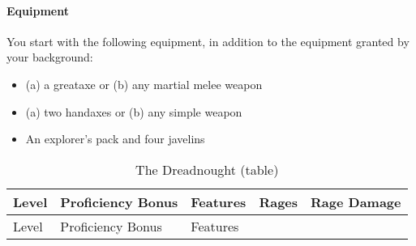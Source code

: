 \paragraph{Equipment}\label{_equipment}

You start with the following equipment, in addition to the equipment
granted by your background:

\begin{itemize}
\item
  (a) a greataxe or (b) any martial melee weapon
\item
  (a) two handaxes or (b) any simple weapon
\item
  An explorer's pack and four javelins
\end{itemize}

\begin{longtable}[]{@{}
  >{\raggedright\arraybackslash}p{}
  >{\raggedright\arraybackslash}p{}
  >{\raggedright\arraybackslash}p{}
  >{\raggedright\arraybackslash}p{}
  >{\raggedright\arraybackslash}p{}@{}}
\caption{The Dreadnought
(table)}\label{dreadnought-table}\tabularnewline
\toprule\noalign{}
\begin{minipage}[b]{\linewidth}\raggedright
Level
\end{minipage} & \begin{minipage}[b]{\linewidth}\raggedright
Proficiency Bonus
\end{minipage} & \begin{minipage}[b]{\linewidth}\raggedright
Features
\end{minipage} & \begin{minipage}[b]{\linewidth}\centering
Rages
\end{minipage} & \begin{minipage}[b]{\linewidth}\raggedright
Rage Damage
\end{minipage} \\
\midrule\noalign{}
\endfirsthead
\toprule\noalign{}
\begin{minipage}[b]{\linewidth}\raggedright
Level
\end{minipage} & \begin{minipage}[b]{\linewidth}\raggedright
Proficiency Bonus
\end{minipage} & \begin{minipage}[b]{\linewidth}\raggedright
Features
\end{minipage} & \begin{minipage}[b]{\linewidth}\centering

\end{minipage}
\end{longtable}
